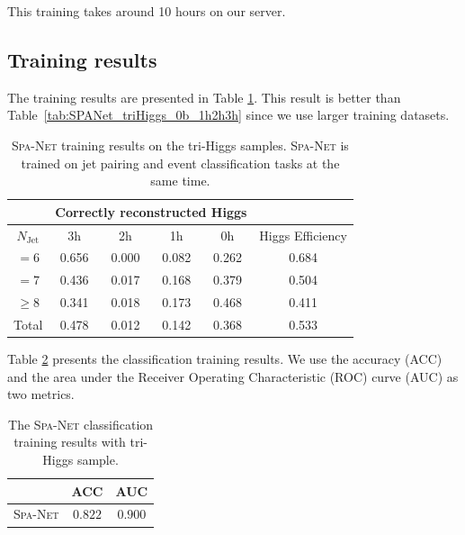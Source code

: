 \documentclass[12pt]{article}
\begin{document}
		This training takes around 10 hours on our server.
	\subsection{Training results}%
	\label{sub:training_results}
		The training results are presented in Table \ref{tab:SPANet_triHiggs_0b_cls_pairing_results}. This result is better than Table~\ref{tab:SPANet_triHiggs_0b_1h2h3h} since we use larger training datasets.

		\begin{table}[htpb]
			\centering
			\caption{\textsc{Spa-Net} training results on the tri-Higgs samples. \textsc{Spa-Net} is trained on jet pairing and event classification tasks at the same time.}
			\label{tab:SPANet_triHiggs_0b_cls_pairing_results}
			\begin{tabular}{c|cccc|c}
			\multicolumn{1}{l|}{} & \multicolumn{4}{c|}{Correctly reconstructed Higgs} & \multicolumn{1}{l}{} \\ \hline
			$N_\text{Jet}$        & 3h          & 2h         & 1h         & 0h         & Higgs Efficiency     \\ \hline
			$=6$                  & 0.656       & 0.000      & 0.082      & 0.262      & 0.684                \\
			$=7$                  & 0.436       & 0.017      & 0.168      & 0.379      & 0.504                \\
			$\ge 8$               & 0.341       & 0.018      & 0.173      & 0.468      & 0.411                \\ \hline
			Total                 & 0.478       & 0.012      & 0.142      & 0.368      & 0.533               
			\end{tabular}
			
		\end{table}

		Table \ref{tab:SPANet_triHiggs_0b_cls_classification_results} presents the classification training results. We use the accuracy (ACC) and the area under the Receiver Operating Characteristic (ROC) curve (AUC) as two metrics.
		\begin{table}[htpb]
			\centering
			\caption{The \textsc{Spa-Net} classification training results with tri-Higgs sample.}
			\label{tab:SPANet_triHiggs_0b_cls_classification_results}
			\begin{tabular}{c|cc}
				             & ACC     & AUC      \\ \hline
			\textsc{Spa-Net} & $0.822$ & $0.900 $
			\end{tabular}
		\end{table}
\end{document}
